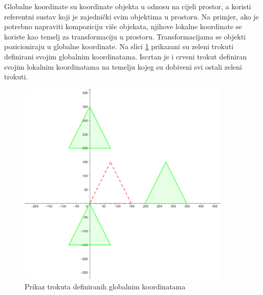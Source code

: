 \documentclass{foi}
\begin{document}
Globalne koordinate su koordinate objekta u odnosu na cijeli prostor, a koristi referentni sustav koji je zajednički svim objektima u prostoru. Na primjer, ako je potrebno napraviti kompoziciju više objekata, njihove lokalne koordinate se koriste kao temelj za transformaciju u prostoru. Transformacijama se objekti pozicioniraju u globalne koordinate. Na slici \ref{fig:GlobalneKoordinateTrokuti} prikazani su zeleni trokuti definirani svojim globalnim koordinatama. Iscrtan je i crveni trokut definiran svojim lokalnim koordinatama na temelju kojeg su dobiveni svi ostali zeleni trokuti.
\\
\begin{figure}[H]
    \centering
    \includegraphics[width=0.9\textwidth]{slike/3_GlobalneKoordinateTrokuti.png}
    \captionsetup{justification=centering}
    \caption{Prikaz trokuta definiranih globalnim koordinatama}
\label{fig:GlobalneKoordinateTrokuti}
\end{figure}
\end{document}
